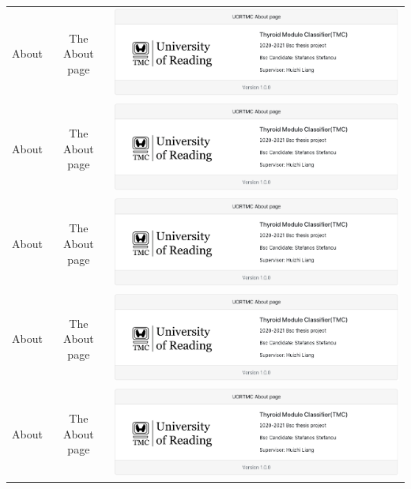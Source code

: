 \begin{center}
\begin{tabular}{ |c|c|c| }
					About & The About page &\includegraphics[scale=0.2]{figures/component-about}\\
					About & The About page &\includegraphics[scale=0.2]{figures/component-about}\\
					About & The About page &\includegraphics[scale=0.2]{figures/component-about}\\
					About & The About page &\includegraphics[scale=0.2]{figures/component-about}\\
					About & The About page &\includegraphics[scale=0.2]{figures/component-about}\\
					\hline
				\end{tabular}
			\end{center}
			